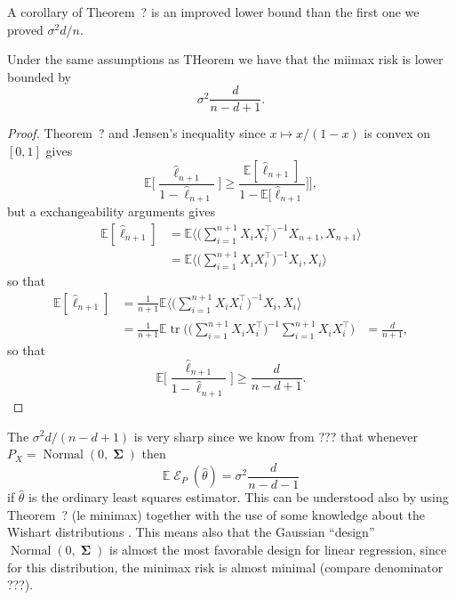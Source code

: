 \documentclass[
	fontsize=11pt, %
	twoside=false, %
	numbers=noenddot, %
]{kaobook}
\DeclareMathOperator{\cE}{{\mathcal E}}
\DeclareMathOperator{\bSigma}{\boldsymbol \Sigma}
\DeclareMathOperator{\tr}{tr}
\DeclareMathOperator{\nor}{Normal}
\newcommand{\E}{\mathbb E}
\newcommand{\wh}{\widehat}
\begin{document}
A corollary of Theorem~? is an improved lower bound than the first one we proved $\sigma^2 d / n$.

\begin{corollary}
	Under the same assumptions as THeorem we have that the miimax risk is lower bounded by
	\begin{equation*}
		\sigma^2 \frac{d}{n - d + 1}.
	\end{equation*}
\end{corollary}

\begin{proof}
	Theorem~? and Jensen's inequality since $x \mapsto x / (1-x)$ is convex on $[0, 1]$ gives
	\begin{equation*}
		\E \Big[ \frac{\wh \ell_{n+1}}{1 - \wh \ell_{n+1}} \Big] \geq \frac{\E[\wh \ell_{n+1}]}{1 - \E[\wh \ell_{n+1}}] \Big],
	\end{equation*}
	but a exchangeability arguments gives
	\begin{align*}
		\E [\wh \ell_{n + 1}] &= \E \Big \langle \Big( \sum_{i=1}^{n+1} X_i X_i^\top 
		\Big)^{-1} X_{n+1}, X_{n+1} \Big \rangle \\
		&= \E \Big \langle \Big( \sum_{i=1}^{n+1} X_i X_i^\top \Big)^{-1} X_{i}, X_{i} \Big \rangle
	\end{align*}
	so that
	\begin{align*}
	 	\E [\wh \ell_{n + 1}] &= \frac{1}{n+1} \E \Big \langle \Big( \sum_{i=1}^{n+1} X_i X_i^\top \Big)^{-1} X_{i}, X_{i} \Big \rangle \\
	 	&= \frac{1}{n+1}  \E \tr \bigg( \Big( \sum_{i=1}^{n+1} X_i X_i^\top \Big)^{-1} \sum_{i=1}^{n+1} X_i X_i^\top \bigg) 
	 	&= \frac{d}{n + 1},
	 \end{align*}
	so that
	\begin{equation*}
		\E \Big[ \frac{\wh \ell_{n+1}}{1 - \wh \ell_{n+1}} \Big] \geq \frac{d}{n - d + 1}.
	\end{equation*}
\end{proof}


The $\sigma^2 d / (n - d + 1)$ is very sharp since we know from ??? that whenever $P_X = \nor(0, \bSigma)$ then
\begin{equation*}
	\E \cE_P(\wh \theta) = \sigma^2 \frac{d}{n - d - 1}
\end{equation*}
if $\wh \theta$ is the ordinary least squares estimator. This can be understood also by using Theorem~? (le minimax) together with the use of some knowledge about the Wishart distributions .
This means also that the Gaussian ``design'' $\nor(0, \bSigma)$ is almost the most favorable design for linear regression, since for this distribution, the minimax risk is almost minimal (compare denominator ???).
\end{document}
